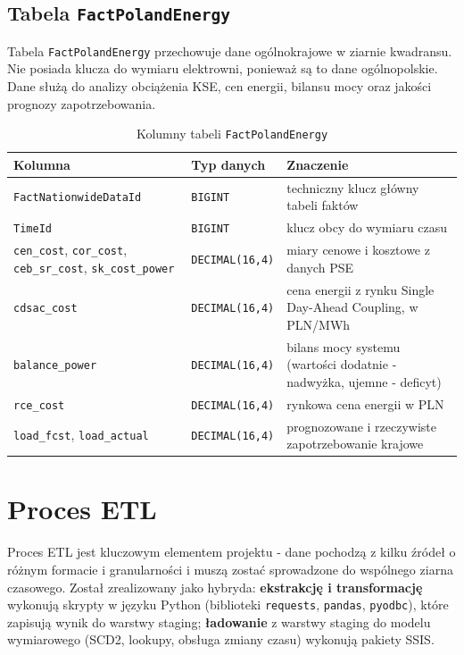 \documentclass[12pt]{article}
\begin{document}
	\subsection{Tabela \texttt{FactPolandEnergy}}

	Tabela \texttt{FactPolandEnergy} przechowuje dane ogólnokrajowe w ziarnie kwadransu. Nie posiada klucza do wymiaru elektrowni, ponieważ są to dane ogólnopolskie. Dane służą do analizy obciążenia KSE, cen energii, bilansu mocy oraz jakości prognozy zapotrzebowania.

	\begin{table}[H]
		\centering
		\small
		\begin{tabularx}{\textwidth}{|p{3.8cm}|p{2.4cm}|X|}
			\hline
			\textbf{Kolumna} & \textbf{Typ danych} & \textbf{Znaczenie} \\
			\hline
			\texttt{FactNationwideDataId} & \texttt{BIGINT} & techniczny klucz główny tabeli faktów \\
			\hline
			\texttt{TimeId} & \texttt{BIGINT} & klucz obcy do wymiaru czasu \\
			\hline
			\texttt{cen\_cost}, \texttt{cor\_cost}, \texttt{ceb\_sr\_cost}, \texttt{sk\_cost\_power} & \texttt{DECIMAL(16,4)} & miary cenowe i kosztowe z danych PSE \\
			\hline
			\texttt{cdsac\_cost} & \texttt{DECIMAL(16,4)} & cena energii z rynku Single Day-Ahead Coupling, w PLN/MWh \\
			\hline
			\texttt{balance\_power} & \texttt{DECIMAL(16,4)} & bilans mocy systemu (wartości dodatnie - nadwyżka, ujemne - deficyt) \\
			\hline
			\texttt{rce\_cost} & \texttt{DECIMAL(16,4)} & rynkowa cena energii w PLN \\
			\hline
			\texttt{load\_fcst}, \texttt{load\_actual} & \texttt{DECIMAL(16,4)} & prognozowane i rzeczywiste zapotrzebowanie krajowe \\
			\hline
		\end{tabularx}
		\caption{Kolumny tabeli \texttt{FactPolandEnergy}}
	\end{table}

	\newpage
	\section{Proces ETL}

	Proces ETL jest kluczowym elementem projektu - dane pochodzą z kilku źródeł o różnym formacie i granularności i muszą zostać sprowadzone do wspólnego ziarna czasowego. Został zrealizowany jako hybryda: \textbf{ekstrakcję i transformację} wykonują skrypty w języku Python (biblioteki \texttt{requests}, \texttt{pandas}, \texttt{pyodbc}), które zapisują wynik do warstwy staging; \textbf{ładowanie} z warstwy staging do modelu wymiarowego (SCD2, lookupy, obsługa zmiany czasu) wykonują pakiety SSIS.
\end{document}
